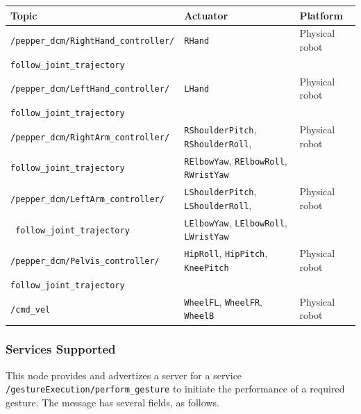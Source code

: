\documentclass{CSSRforAfrica}
\begin{document}
{{\begin{center}
\begin{tabularx}{\linewidth}{| X | l| l|}
\hline 
{\small Topic }                                                                                & {\small Actuator }    &  {\small Platform}       \\
\hline
{\footnotesize \verb+/pepper_dcm/RightHand_controller/+ }  & {\footnotesize  \verb+RHand+} & {\small Physical robot } \\ 
{\footnotesize \verb+follow_joint_trajectory+ }                        &   & \\ 
\hline
{\footnotesize \verb+/pepper_dcm/LeftHand_controller/+ }  & {\footnotesize \verb+LHand+ } & {\small Physical robot } \\ 
{\footnotesize \verb+follow_joint_trajectory+ }  & & \\ 
\hline
{\footnotesize \verb+/pepper_dcm/RightArm_controller/+ }  & {\footnotesize \verb+RShoulderPitch+, \verb+RShoulderRoll+,   } & {\small Physical robot } \\ 
{\footnotesize \verb+follow_joint_trajectory+ }                                          & {\footnotesize \verb+RElbowYaw+, \verb+RElbowRoll+, \verb+RWristYaw+  } & \\
\hline
{\footnotesize \verb+/pepper_dcm/LeftArm_controller/+ }     & {\footnotesize  \verb+LShoulderPitch+, \verb+LShoulderRoll+,  } & {\small Physical robot } \\ 
{\footnotesize \verb+ follow_joint_trajectory+ }                                        & {\footnotesize  \verb+LElbowYaw+, \verb+LElbowRoll+, \verb+LWristYaw+  } & \\ 
\hline
{\footnotesize \verb+/pepper_dcm/Pelvis_controller/+ }  & {\footnotesize \verb+HipRoll+, \verb+HipPitch+,  \verb+KneePitch+ } & {\small Physical robot } \\ 
{\footnotesize \verb+follow_joint_trajectory+ }                                   & {\footnotesize  } & \\ 
\hline
{\footnotesize \verb+/cmd_vel+ }  & {\footnotesize \verb+WheelFL+, \verb+WheelFR+, \verb+WheelB+ } & {\small Physical robot } \\ 
\hline
\end{tabularx}
\end{center}
 

\subsubsection*{Services Supported}
 This node  provides and advertizes a server for a service {\small \verb+/gestureExecution/perform_gesture+} to initiate the performance of a required gesture.
The message has several fields, as follows.

}}
\end{document}
